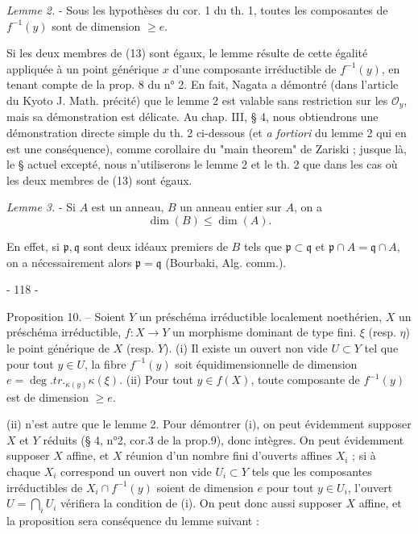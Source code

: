 \emph{Lemme 2.} - Sous les hypothèses du cor. 1 du th. 1, toutes les composantes de $f^{-1}(y)$ sont de dimension $\ge e$.

Si les deux membres de (13) sont égaux, le lemme résulte de cette égalité appliquée à un point générique $x$ d'une composante irréductible de $f^{-1}(y)$, en tenant compte de la prop. 8 du n° 2. En fait, Nagata a démontré (dans l'article du Kyoto J. Math. précité) que le lemme 2 est valable sans restriction sur les $\mathcal{O}_y$, mais sa démonstration est délicate. Au chap. III, § 4, nous obtiendrons une démonstration directe simple du th. 2 ci-dessous (et \emph{a fortiori} du lemme 2 qui en est une conséquence), comme corollaire du "main theorem" de Zariski ; jusque là, le § actuel excepté, nous n'utiliserons le lemme 2 et le th. 2 que dans les cas où les deux membres de (13) sont égaux.

\emph{Lemme 3.} - Si $A$ est un anneau, $B$ un anneau entier sur $A$, on a
$$\dim(B) \le \dim(A).$$

En effet, si $\mathfrak{p}, \mathfrak{q}$ sont deux idéaux premiers de $B$ tels que $\mathfrak{p} \subset \mathfrak{q}$ et $\mathfrak{p} \cap A = \mathfrak{q} \cap A$, on a nécessairement alors $\mathfrak{p} = \mathfrak{q}$ (Bourbaki, Alg. comm.).

\newpage



- 118 -

Proposition 10. -- Soient $Y$ un préschéma irréductible localement noethérien, $X$ un préschéma irréductible, $f : X \to Y$ un morphisme dominant de type fini. $\xi$ (resp. $\eta$) le point générique de $X$ (resp. $Y$).
(i) Il existe un ouvert non vide $U \subset Y$ tel que pour tout $y \in U$, la fibre $f^{-1}(y)$ soit équidimensionnelle de dimension $e = \deg.tr._{\kappa(y)}\kappa(\xi)$.
(ii) Pour tout $y \in f(X)$, toute composante de $f^{-1}(y)$ est de dimension $\ge e$.

(ii) n'est autre que le lemme 2. Pour démontrer (i), on peut évidemment supposer $X$ et $Y$ réduits (§ 4, n°2, cor.3 de la prop.9), donc intègres. On peut évidemment supposer $X$ affine, et $X$ réunion d'un nombre fini d'ouverts affines $X_i$ ; si à chaque $X_i$ correspond un ouvert non vide $U_i \subset Y$ tels que les composantes irréductibles de $X_i \cap f^{-1}(y)$ soient de dimension $e$ pour tout $y \in U_i$, l'ouvert $U = \bigcap_i U_i$ vérifiera la condition de (i). On peut donc aussi supposer $X$ affine, et la proposition sera conséquence du lemme suivant :

